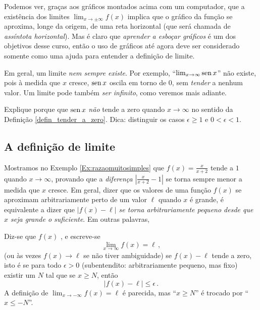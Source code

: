 \begin{obs}
Podemos ver, graças aos gráficos montados acima com um computador, 
que a existência dos limites $\lim_{x\to
\pm\infty}f(x)$ implica que o gráfico da função se aproxima,
longe da origem, de uma reta horizontal (que será chamada de
\emph{assíntota horizontal}).
Mas é claro que \emph{aprender a esboçar gráficos} 
é um dos objetivos desse curso, 
então o uso de gráficos até agora deve ser considerado somente como
uma ajuda para entender a definição de limite.
\end{obs}

\begin{obs}
Em geral, um limite \emph{nem sempre existe}. 
Por exemplo,
``$\lim_{x\to \infty}\operatorname{sen} x$'' não existe, pois à medida que $x$
cresce, $\operatorname{sen} x$ oscila em torno de $0$, sem \emph{tender} a nenhum
valor.
Um limite pode também \emph{ser infinito}, como veremos
mais adiante.  
\end{obs}

\begin{exo}
Explique porque que $\operatorname{sen} x$ \emph{não} tende a zero quando $x\to \infty$
no sentido da Definição \ref{defin_tender_a_zero}.
Dica:
distinguir os casos $\epsilon\geq 1$ e $0<\epsilon<1$.
\end{exo}


\subsection{A definição de limite}

Mostramos no Exemplo \ref{Ex:razaomuitosimples} que
$f(x)=\frac{x}{x+2}$ tende a $1$ quando $x\to\infty$, provando que a
\emph{diferença} $|\frac{x}{x+2}-1|$ se torna sempre menor a medida que
$x$ cresce. 
Em geral, dizer que os
valores de uma função $f(x)$ se aproximam arbitrariamente perto de um
valor $\ell$ quando $x$ é grande, é equivalente a dizer que
\emph{$|f(x)-\ell|$ se torna arbitrariamente pequeno desde que $x$ seja 
grande o suficiente}. Em outras palavras,

\begin{defin}\label{Def:limiteinfinito}
Diz-se que $f(x)$ , e
escreve-se 
\[\lim_{x\to \infty}f(x)=\ell\,,\] 
(ou às vezes $f(x)\to \ell$ se não tiver
ambiguidade) se $f(x)-\ell$ tende a zero, isto é se 
para todo $\epsilon>0$ (subentendito: arbitrariamente pequeno, mas fixo)
existir um $N$ tal que se $x\geq N$, então 
$$|f(x)-\ell|\leq \epsilon\,.$$
A definição de $\lim_{x\to -\infty}f(x)=\ell$ é parecida, mas
``$x\geq N$'' é trocado por ``$x\leq -N$''.
\end{defin}

